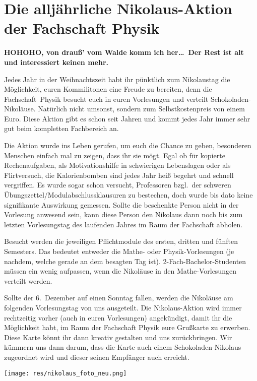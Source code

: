 \section{Die alljährliche Nikolaus-Aktion der Fachschaft Physik}
\begin{multicols}{2}
\textbf{HOHOHO, von drauß' vom Walde komm ich her\dots\
	Der Rest ist alt und interessiert keinen mehr.}

Jedes Jahr in der Weihnachtszeit habt ihr pünktlich zum Nikolaustag die Möglichkeit, euren Kommilitonen eine Freude zu bereiten, denn die Fachschaft~Physik besucht euch in euren Vorlesungen und verteilt Schokoladen-Nikoläuse.
Natürlich nicht umsonst, sondern zum Selbstkostenpreis von einem Euro.
Diese Aktion gibt es schon seit Jahren und kommt jedes Jahr immer sehr gut beim kompletten Fachbereich an.

Die Aktion wurde ins Leben gerufen, um euch die Chance zu geben, besonderen Menschen einfach mal zu zeigen, dass ihr sie mögt.
Egal ob für kopierte Rechenaufgaben, als Motivationshilfe in schwierigen Lebenslagen oder als Flirtversuch, die Kalorienbomben sind jedes Jahr heiß begehrt und schnell vergriffen.
Es wurde sogar schon versucht, Professoren bzgl.\ der schweren Übungszettel/Modulabschlussklausuren zu bestechen, doch wurde bis dato keine signifikante Auswirkung gemessen.
Sollte die beschenkte Person nicht in der Vorlesung anwesend sein, kann diese Person den Nikolaus dann noch bis zum letzten Vorlesungstag des laufenden Jahres im Raum der Fachschaft abholen.

Besucht werden die jeweiligen Pflichtmodule des ersten, dritten und fünften Semesters.
Das bedeutet entweder die Mathe- oder Physik-Vorlesungen (je nachdem, welche gerade an dem besagten Tag ist).
2-Fach-Bachelor-Studenten müssen ein wenig aufpassen, wenn die Nikoläuse in den Mathe-Vorlesungen verteilt werden.

Sollte der 6.~Dezember auf einen Sonntag fallen, werden die Nikoläuse am folgenden Vorlesungstag von uns ausgeteilt.
Die Nikolaus-Aktion wird immer rechtzeitig vorher (auch in euren Vorlesungen) angekündigt, damit ihr die Möglichkeit habt, im Raum der Fachschaft Physik eure Grußkarte zu erwerben.
Diese Karte könnt ihr dann kreativ gestalten und uns zurückbringen.
Wir kümmern uns dann darum, dass die Karte auch einem Schokoladen-Nikolaus zugeordnet wird und dieser seinen Empfänger auch erreicht.

\end{multicols}

\vspace{\fill}
\begin{center}
	\texttt{[image: res/nikolaus\_foto\_neu.png]}
\end{center}
